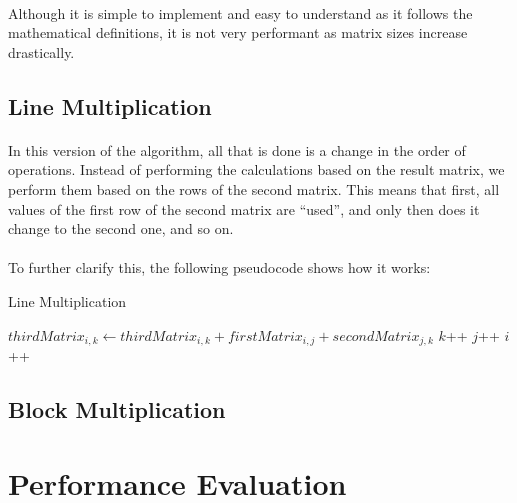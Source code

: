 \documentclass{report}
\begin{document}
    \paragraph{}Although it is simple to implement and easy to understand as it follows the mathematical definitions, it is not very performant as matrix sizes increase drastically.

    \subsection*{Line Multiplication}

    \paragraph{}In this version of the algorithm, all that is done is a change in the order of operations. Instead of performing the calculations based on the result matrix, we perform them based on the rows of the second matrix. This means that first, all values of the first row of the second matrix are ``used'', and only then does it change to the second one, and so on.

    \paragraph{}To further clarify this, the following pseudocode shows how it works:

    \begin{algorithm}
      \caption{Line Multiplication}\label{euclid}
      \begin{algorithmic}[1]
        \State $thirdMatrix_{i, k} \leftarrow thirdMatrix_{i, k} + firstMatrix_{i, j} + secondMatrix_{j, k}$
        \State $k$++
        \EndWhile
        \State $j$++
        \EndWhile
        \State $i$++
        \EndWhile
        \EndProcedure
      \end{algorithmic}
    \end{algorithm}

    \subsection*{Block Multiplication}

    \section*{Performance Evaluation}
\end{document}
